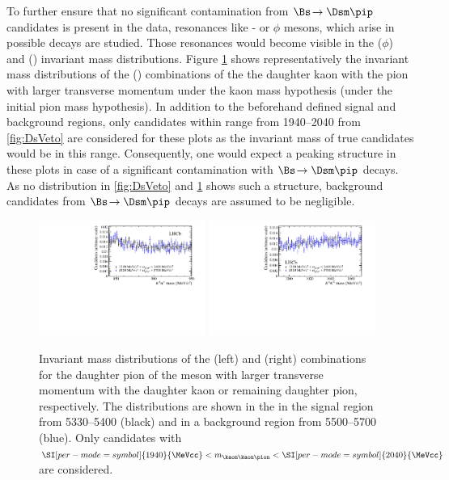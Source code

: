 To further ensure that no significant contamination from $\Bs\!\to\Dsm\pip$ candidates is present in the data, resonances like \Kstarz- or $\phi$ mesons, which arise in possible \Dsm decays are studied.
Those resonances would become visible in the \kaon\kaon ($\phi$) and \kaon\pion (\Kstarz) invariant mass distributions.
Figure \ref{fig:phi_Kst_veto} shows representatively the invariant mass distributions of the \kaon\kaon (\kaon\pion) combinations of the the daughter kaon with the
pion with larger transverse momentum under the kaon mass hypothesis (under the initial pion mass hypothesis).
In addition to the beforehand defined signal and background regions, only candidates within \a range from \SIrange[per-mode=symbol]{1940}{2040}{\MeVcc} from \cref{fig:DsVeto} are considered for these plots as the invariant mass of true \Ds candidates would be in this range.
Consequently, one would expect a peaking structure in these plots in case of a significant contamination with $\Bs\!\to\Dsm\pip$ decays.
As no distribution in \cref{fig:DsVeto} and \cref{fig:phi_Kst_veto} shows such a structure, background candidates from $\Bs\!\to\Dsm\pip$ decays are assumed to be negligible.
\begin{figure}[tbp]
    \centering
    \includegraphics[width=0.485\textwidth]{07selection/figs/KstarHypo2.pdf}
    \includegraphics[width=0.485\textwidth]{07selection/figs/PhiHypo2.pdf}
    \caption{Invariant mass distributions of the \kaon\pion (left) and \kaon\kaon (right) combinations for the daughter pion of the \Dm meson with larger transverse momentum with the daughter kaon or remaining daughter pion, respectively.
    The distributions are shown in the in the \Bs signal region from \SIrange[per-mode=symbol]{5330}{5400}{\MeVcc} (black) and in a background region from \SIrange[per-mode=symbol]{5500}{5700}{\MeVcc} (blue).
    Only candidates with $\SI[per-mode=symbol]{1940}{\MeVcc}<m_{\kaon\kaon\pion}<\SI[per-mode=symbol]{2040}{\MeVcc}$ are considered.}
    \label{fig:phi_Kst_veto}
\end{figure}

